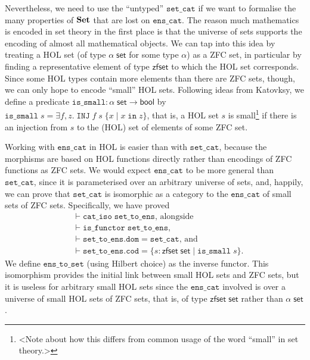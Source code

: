 \documentclass[twoside,titlepage,11pt]{article}
\begin{document}
Nevertheless, we need to use the ``untyped'' $\mathtt{set\_cat}$ if we want to formalise the many properties of $\mathbf{Set}$ that are lost on $\mathtt{ens\_cat}$.
The reason much mathematics is encoded in set theory in the first place is that the universe of sets supports the encoding of almost all mathematical objects.
We can tap into this idea by treating a HOL set (of type $\alpha\;\mathsf{set}$ for some type $\alpha$) as a ZFC set, in particular by finding a representative element of type $\mathsf{zfset}$ to which the HOL set corresponds.
Since some HOL types contain more elements than there are ZFC sets, though, we can only hope to encode ``small'' HOL sets.
Following ideas from Katovksy, we define a predicate $\mathtt{is\_small}:\alpha\;\mathsf{set}\to\mathsf{bool}$ by $\mathtt{is\_small}\;s=\exists{f,z}.\;\mathtt{INJ}\;f\;s\;\{x\mid x\operatorname{\mathtt{in}} z\}$, that is, a HOL set $s$ is small\footnote{<Note about how this differs from common usage of the word ``small'' in set theory.>} if there is an injection from $s$ to the (HOL) set of elements of some ZFC set.

Working with $\mathtt{ens\_cat}$ in HOL is easier than with $\mathtt{set\_cat}$, because the morphisms are based on HOL functions directly rather than encodings of ZFC functions as ZFC sets.
We would expect $\mathtt{ens\_cat}$ to be more general than $\mathtt{set\_cat}$, since it is parameterised over an arbitrary universe of sets, and, happily, we can prove that $\mathtt{set\_cat}$ is isomorphic as a category to the $\mathtt{ens\_cat}$ of small sets of ZFC sets.
Specifically, we have proved
\begin{align*}
&\vdash\mathtt{cat\_iso}\;\mathtt{set\_to\_ens}\text{, alongside}\\
&\vdash\mathtt{is\_functor}\;\mathtt{set\_to\_ens}\text{,}\\
&\vdash\mathtt{set\_to\_ens}.\mathtt{dom}=\mathtt{set\_cat}\text{, and}\\
&\vdash\mathtt{set\_to\_ens}.\mathtt{cod}=\{s:\mathsf{zfset}\;\mathsf{set}\mid\mathtt{is\_small}\;s\}\text{.}
\end{align*}
We define $\mathtt{ens\_to\_set}$ (using Hilbert choice) as the inverse functor.
This isomorphism provides the initial link between small HOL sets and ZFC sets, but it is useless for arbitrary small HOL sets since the $\mathtt{ens\_cat}$ involved is over a universe of small HOL sets of ZFC sets, that is, of type $\mathsf{zfset}\;\mathsf{set}$ rather than $\alpha\;\mathsf{set}$.
\end{document}
